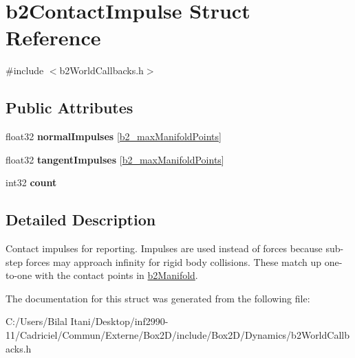 \hypertarget{structb2_contact_impulse}{}\section{b2\+Contact\+Impulse Struct Reference}
\label{structb2_contact_impulse}


{\ttfamily \#include $<$b2\+World\+Callbacks.\+h$>$}

\subsection*{Public Attributes}
\begin{DoxyCompactItemize}
\item 
float32 {\bfseries normal\+Impulses} \mbox{[}\hyperlink{b2_settings_8h_aa5f44cc9edf711433dea2b2ec94f3c42}{b2\+\_\+max\+Manifold\+Points}\mbox{]}\hypertarget{structb2_contact_impulse_a553d3562a3a34ea013e2d9860f6fd207}{}\label{structb2_contact_impulse_a553d3562a3a34ea013e2d9860f6fd207}

\item 
float32 {\bfseries tangent\+Impulses} \mbox{[}\hyperlink{b2_settings_8h_aa5f44cc9edf711433dea2b2ec94f3c42}{b2\+\_\+max\+Manifold\+Points}\mbox{]}\hypertarget{structb2_contact_impulse_aebd9875b1f55a90865770a53e30e609a}{}\label{structb2_contact_impulse_aebd9875b1f55a90865770a53e30e609a}

\item 
int32 {\bfseries count}\hypertarget{structb2_contact_impulse_a258e094ab0d769971f40d6c144420bf7}{}\label{structb2_contact_impulse_a258e094ab0d769971f40d6c144420bf7}

\end{DoxyCompactItemize}


\subsection{Detailed Description}
Contact impulses for reporting. Impulses are used instead of forces because sub-\/step forces may approach infinity for rigid body collisions. These match up one-\/to-\/one with the contact points in \hyperlink{structb2_manifold}{b2\+Manifold}. 

The documentation for this struct was generated from the following file\+:\begin{DoxyCompactItemize}
\item 
C\+:/\+Users/\+Bilal Itani/\+Desktop/inf2990-\/11/\+Cadriciel/\+Commun/\+Externe/\+Box2\+D/include/\+Box2\+D/\+Dynamics/b2\+World\+Callbacks.\+h\end{DoxyCompactItemize}
